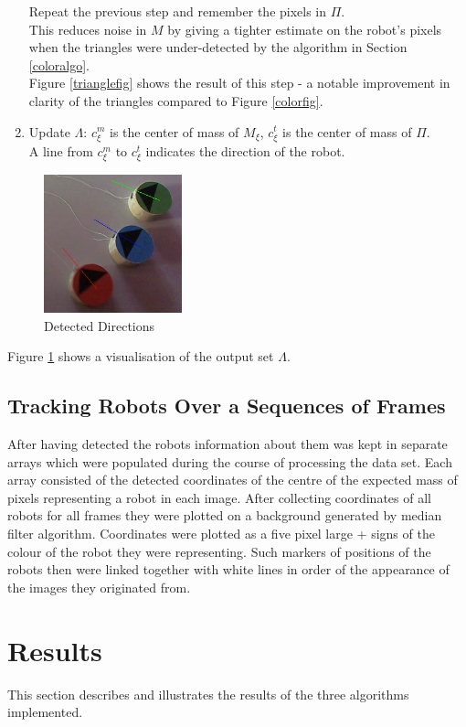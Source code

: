 \documentclass[10pt,a4paper]{article}
\begin{document}
\begin{enumerate}
    Repeat the previous step and remember the pixels in $\Pi$. \\
    This reduces noise in $M$ by giving a tighter estimate on the robot's
    pixels when the triangles were under-detected by the algorithm in 
    Section \ref{coloralgo}. \\
    Figure \ref{trianglefig} shows the result of this step - a notable
    improvement in clarity of the triangles compared to Figure \ref{colorfig}.
    \item
    Update $\Lambda$: $c^m_\xi$ is the center of mass of $M_\xi$, $c^t_\xi$ is 
    the center of mass of $\Pi$. \\
    A line from $c^m_\xi$ to $c^t_\xi$ indicates the direction of the robot.
\end{enumerate} 
\begin{figure}[ht]
    \centering
    \includegraphics[width=40mm]{d1_i5_result.jpg}
    \caption{Detected Directions}
    \label{directionfig}
\end{figure} 
Figure \ref{directionfig} shows a visualisation of the output set $\Lambda$.

\subsection{Tracking Robots Over a Sequences of Frames}\label{trackingalgo}
After having detected the robots information about them was kept in separate 
arrays which were populated during the course of processing the data set. Each 
array consisted of  the detected coordinates of the centre of the expected mass 
of pixels  representing a robot in each image. After collecting coordinates of 
all robots for all frames they were plotted on a background generated by median 
filter algorithm. Coordinates were plotted as a five pixel large + signs of the 
colour of the robot they were representing. Such markers of positions of the 
robots then were linked together with white lines in order of the appearance of 
the images they originated from. 


\section{Results}\label{results}
This section describes and illustrates the results of the three algorithms 
implemented. 
\end{document}
